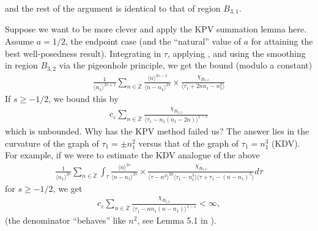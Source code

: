 \documentclass[12pt,reqno]{amsart}
\numberwithin{equation}{section}  %
\renewcommand{\cref}{\Cref}
\newcommand{\zz}{\mathbb{Z}}
\newcommand{\zzdot}{\dot{\zz}}
\newcommand{\ee}{\varepsilon}
\begin{document}
%
and the rest of the argument is identical to that of region $B_{3,1}$.
\begin{framed}
  Suppose we want to be more clever and apply the KPV summation lemma here. Assume $a=1/2$, the endpoint case (and the ``natural'' value of $a$ for attaining the best well-posedness result). Integrating in $\tau$, applying \cref{lem:calc}, and using the smoothing in region $B_{3,2}$ via the pigeonhole principle, we get the bound (modulo a constant)
%
%
\begin{equation*}
\begin{split}
  \frac{1}{\langle n_{1} \rangle^{2s+1}} \sum_{n \in \zzdot} \frac{\langle n \rangle ^{2s-1}}{\langle n - n_{1}\rangle ^{2s}}  \times \frac{\chi_{B_{3,2}}}{\langle \tau_{1} + 2nn_{1} - n_{1}^{2} \rangle} 
\end{split}
\end{equation*}
%
%
If $s \ge -1/2$, we bound this by
\begin{equation*}
\begin{split}
  c_{\ee}\sum_{n \in \zzdot} \frac{\chi_{B_{3,2}}}{\langle \tau_{1} - n_{1}(  n_{1} - 2n) \rangle^{1-\ee}}
\end{split}
\end{equation*}
which is unbounded. Why has the KPV method failed us? The answer lies in the curvature of the graph of $\tau_{1} = \pm n_{1}^{2}$ versus that of the graph of $\tau_{1} = n_{1}^{3}$ (KDV). For example, if we were to estimate the KDV analogue of the above%
%
\begin{equation*}
\begin{split}
      \frac{1}{\langle n_{1} \rangle^{2s}} \sum_{n \in \zzdot} \int_{\tau} \frac{\langle n \rangle ^{2s}}{\langle n - n_{1}\rangle ^{2s}}  \times \frac{\chi_{B_{3,2}}}{\langle \tau - n^{3} \rangle^{2a} \langle
      \tau_{1} - n_{1}^{3} \rangle  \langle \tau + \tau_{1} - (n - n_{1})^{3} \rangle} d \tau
\end{split}
\end{equation*}
%
%
for $s \ge -1/2$, we get
%
%
\begin{equation*}
\begin{split}
  c_{\ee}\sum_{n \in \zzdot} \frac{\chi_{B_{3,2}}}{\langle \tau_{1} - nn_{1}(n - n_{1})\rangle^{1-\ee}} < \infty,
\end{split}
\end{equation*}
%
(the denominator ``behaves'' like $n^{2}$, see Lemma 5.1 in \cite{Kenig:1996yn}).
%
\end{framed}
\end{document}
